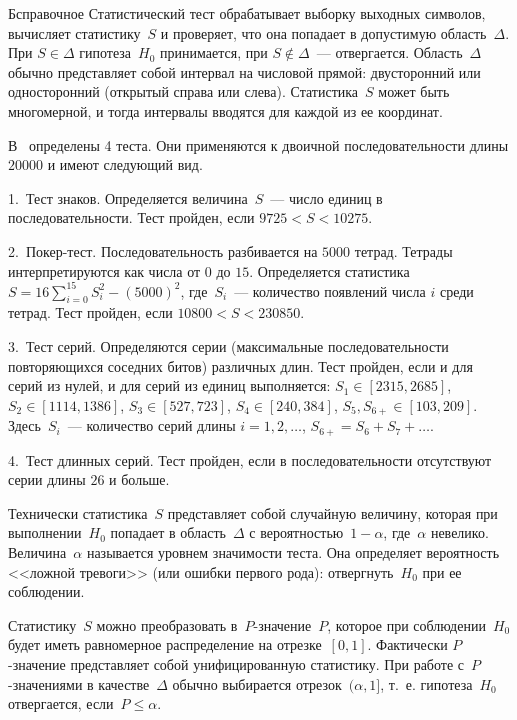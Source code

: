 \begin{appendix}{Б}{справочное}
Статистический тест обрабатывает выборку выходных символов, 
вычисляет статистику~$S$ и проверяет, что она попадает
в допустимую область~$\Delta$. При $S\in\Delta$ гипотеза~$H_0$ принимается,
при $S\notin\Delta$~--- отвергается. Область~$\Delta$ обычно представляет
собой интервал на числовой прямой: двусторонний или односторонний 
(открытый справа или слева). Статистика~$S$ может быть многомерной,
и тогда интервалы вводятся для каждой из ее координат.

\begin{example}
В~\cite{FIPS140-2} определены 4 теста. Они применяются к двоичной 
последовательности длины $20000$ и имеют следующий вид.

1.~Тест знаков. Определяется величина~$S$~--- 
число единиц в последовательности. 
Тест пройден, если $9725<S<10275$.

2.~Покер-тест. Последовательность разбивается на $5000$ тетрад.
Тетрады интерпретируются как числа от $0$ до $15$.
Определяется статистика~$S=16\sum_{i=0}^{15}S_i^2-(5000)^2$,
где~$S_i$~--- количество появлений числа $i$ среди тетрад.
Тест пройден, если $10800<S<230850$.

3.~Тест серий. Определяются серии (максимальные последовательности 
повторяющихся соседних битов) различных длин. 
Тест пройден, если и для серий из нулей, и для серий из единиц выполняется: 
$S_1\in[2315,2685]$,
$S_2\in[1114,1386]$,
$S_3\in[527,723]$,
$S_4\in[240,384]$,
$S_5,S_{6+}\in[103,209]$.
Здесь~$S_i$~--- количество серий длины $i=1,2,\ldots$, 
$S_{6+}=S_6+S_7+\ldots$.

4.~Тест длинных серий. Тест пройден, если в последовательности отсутствуют 
серии длины $26$ и больше.
\end{example}

Технически статистика~$S$ представляет собой случайную величину, 
которая при выполнении~$H_0$ попадает в область~$\Delta$ 
с вероятностью~$1-\alpha$, где~$\alpha$ невелико.
%
Величина~$\alpha$ называется уровнем значимости теста. 
%
Она определяет вероятность <<ложной тревоги>> (или ошибки первого рода): 
отвергнуть~$H_0$ при ее соблюдении.

Статистику~$S$ можно преобразовать в~$P$-значение~$P$, 
которое при соблюдении~$H_0$ будет иметь равномерное распределение на 
отрезке~$[0,1]$. Фактически $P$-значение представляет собой унифицированную 
статистику. При работе с~$P$-значениями в качестве~$\Delta$ обычно выбирается
отрезок~$(\alpha,1]$, т.~е. гипотеза~$H_0$ отвергается, если~$P\leq\alpha$.


\end{appendix}
